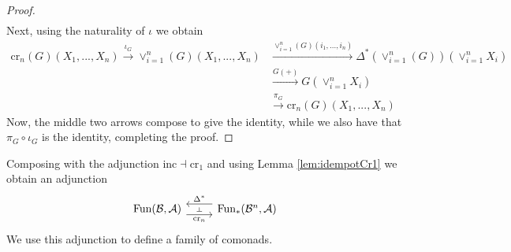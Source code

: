 \begin{proof}
\begin{align*}
    \end{align*}
    Next, using the naturality of $\iota$ we obtain
    \begin{align*}
        \text{cr}_n(G)(X_1,...,X_n)\xrightarrow{\iota_G}\lor_{i=1}^n(G)(X_1,...,X_n)&\xrightarrow{\lor_{i=1}^n(G)(i_1,...,i_n)}\Delta^*(\lor_{i=1}^n(G))(\lor_{i=1}^nX_i) \\
        &\xrightarrow{G(+)}G(\lor_{i=1}^nX_i) \\
        &\xrightarrow{\pi_G}\text{cr}_n(G)(X_1,...,X_n)
    \end{align*}
    Now, the middle two arrows compose to give the identity, while we also have that $\pi_G\circ \iota_G$ is the identity, completing the proof.

\end{proof}

Composing with the adjunction $\text{inc}\dashv \text{cr}_1$ and using Lemma \ref{lem:idempotCr1} we obtain an adjunction
\[\begin{tikzcd}
	{\text{Fun}(\mathcal{B},\mathcal{A})} & {\text{Fun}_*(\mathcal{B}^n,\mathcal{A})}
	\arrow[""{name=0, anchor=center, inner sep=0}, "{\text{cr}_n}"', shift right=2, from=1-1, to=1-2]
	\arrow[""{name=1, anchor=center, inner sep=0}, "{\Delta^*}"', shift right=2, from=1-2, to=1-1]
	\arrow["\dashv"{anchor=center, rotate=-90}, draw=none, from=1, to=0]
\end{tikzcd}\]
We use this adjunction to define a family of comonads.

